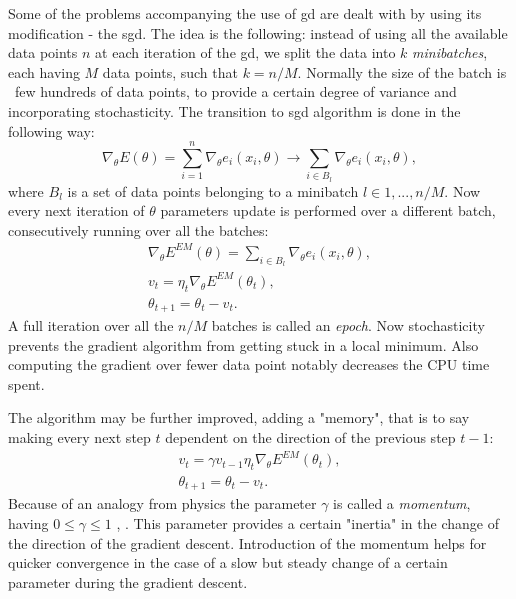 Some of the problems accompanying the use of \gls{gd} are dealt with by using its modification - the \gls{sgd}. The idea is the following: instead of using all the available data points $n$ at each iteration of the \gls{gd}, we split the data into $k$ \textit{minibatches}, each having $M$ data points, such that $k = n/M$. Normally the size of the batch is ~few hundreds of data points, to provide a certain degree of variance and incorporating stochasticity. The transition to \gls{sgd} algorithm is done in the following way:
\begin{equation}
\nabla_{\theta}E(\theta) = \sum^n_{i=1} \nabla_{\theta}e_i(x_i,\theta) \rightarrow \sum_{i \in B_l} \nabla_{\theta}e_i(x_i,\theta),
\end{equation}
where $B_l$ is a set of data points belonging to a minibatch $l \in 1, ... , n/M$. Now every next iteration of $\theta$ parameters update is performed over a different batch, consecutively running over all the batches: 
\begin{equation}
\begin{array}{lcl} 
\nabla_{\theta}E^{EM}(\theta) = \sum_{i \in B_l} \nabla_{\theta}e_i(x_i,\theta),\\
v_t=\eta_t\nabla_{\theta}E^{EM}(\theta_t),\\
\theta_{t+1}=\theta_t-v_t.
\end{array} 
\end{equation}
A full iteration over all the $n/M$ batches is called an \textit{epoch}. Now stochasticity prevents the gradient algorithm from getting stuck in a local minimum. Also computing the gradient over fewer data point notably decreases the CPU time spent. 

The algorithm may be further improved, adding a "memory", that is to say making every next step $t$ dependent on the direction of the previous step $t-1$:
\begin{equation}
\begin{array}{lcl} 
v_t=\gamma v_{t-1}\eta_t\nabla_{\theta}E^{EM}(\theta_t),\\
\theta_{t+1}=\theta_t-v_t.
\end{array} 
\end{equation}
Because of an analogy from physics the parameter $\gamma$ is called a \textit{momentum}, having $0\le\gamma \le 1$ \cite{grad_momentum1}, \cite{grad_momentum2}. This parameter provides a certain "inertia" in the change of the direction of the gradient descent. Introduction of the momentum helps for quicker convergence in the case of a slow but steady change of a certain parameter during the gradient descent.

